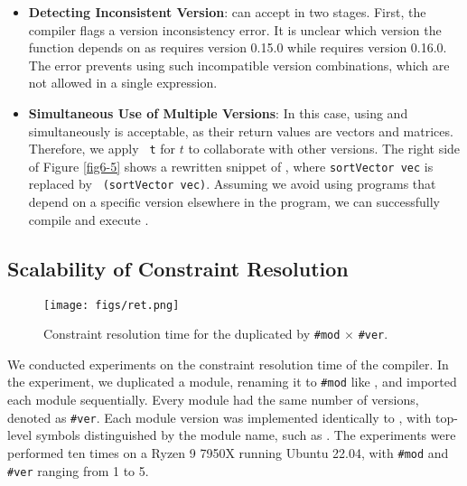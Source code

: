 \begin{itemize}
\item \textbf{Detecting Inconsistent Version}:
\mylang{} can accept  in two stages. First, the compiler flags a version inconsistency error.
It is unclear which  version the  function depends on as  requires version 0.15.0 while  requires version 0.16.0.
The error prevents using such incompatible version combinations, which are not allowed in a single expression.

\item \textbf{Simultaneous Use of Multiple Versions}:
In this case, using  and  simultaneously is acceptable, as their return values are vectors and matrices. Therefore, we apply \texttt{ t} for $t$ to collaborate with other versions.
The right side of Figure \ref{fig6-5} shows a rewritten snippet of , where \texttt{sortVector vec} is replaced by \texttt{ (sortVector vec)}. Assuming we avoid using programs that depend on a specific version elsewhere in the program, we can successfully compile and execute .
\end{itemize}

\subsection{Scalability of Constraint Resolution}
\begin{figure}[tbp]
    \centering
    \texttt{[image: figs/ret.png]}
    \caption{Constraint resolution time for the duplicated  by \texttt{\#mod} $\times$ \texttt{\#ver}.}
    \label{fig:consres}
\end{figure}

We conducted experiments on the constraint resolution time of the \mylang{} compiler. In the experiment, we duplicated a \mylang{} module, renaming it to \texttt{\#mod} like , and imported each module sequentially. Every module had the same number of versions, denoted as \texttt{\#ver}. Each module version was implemented identically to , with top-level symbols distinguished by the module name, such as . The experiments were performed ten times on a Ryzen 9 7950X running Ubuntu 22.04, with \texttt{\#mod} and \texttt{\#ver} ranging from 1 to 5.


